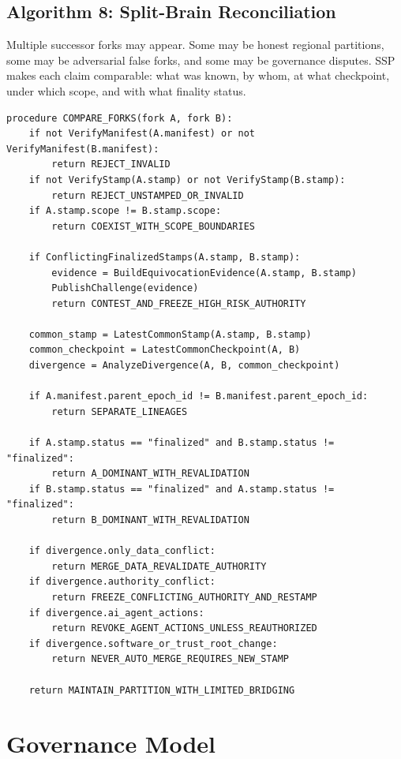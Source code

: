 \documentclass[11pt,letterpaper]{article}
\begin{document}
\subsection{Algorithm 8: Split-Brain Reconciliation}

Multiple successor forks may appear. Some may be honest regional partitions, some may be adversarial false forks, and some may be governance disputes. SSP makes each claim comparable: what was known, by whom, at what checkpoint, under which scope, and with what finality status.

\begin{lstlisting}[caption={Stamped inter-fork reconciliation}]
procedure COMPARE_FORKS(fork A, fork B):
    if not VerifyManifest(A.manifest) or not VerifyManifest(B.manifest):
        return REJECT_INVALID
    if not VerifyStamp(A.stamp) or not VerifyStamp(B.stamp):
        return REJECT_UNSTAMPED_OR_INVALID
    if A.stamp.scope != B.stamp.scope:
        return COEXIST_WITH_SCOPE_BOUNDARIES

    if ConflictingFinalizedStamps(A.stamp, B.stamp):
        evidence = BuildEquivocationEvidence(A.stamp, B.stamp)
        PublishChallenge(evidence)
        return CONTEST_AND_FREEZE_HIGH_RISK_AUTHORITY

    common_stamp = LatestCommonStamp(A.stamp, B.stamp)
    common_checkpoint = LatestCommonCheckpoint(A, B)
    divergence = AnalyzeDivergence(A, B, common_checkpoint)

    if A.manifest.parent_epoch_id != B.manifest.parent_epoch_id:
        return SEPARATE_LINEAGES

    if A.stamp.status == "finalized" and B.stamp.status != "finalized":
        return A_DOMINANT_WITH_REVALIDATION
    if B.stamp.status == "finalized" and A.stamp.status != "finalized":
        return B_DOMINANT_WITH_REVALIDATION

    if divergence.only_data_conflict:
        return MERGE_DATA_REVALIDATE_AUTHORITY
    if divergence.authority_conflict:
        return FREEZE_CONFLICTING_AUTHORITY_AND_RESTAMP
    if divergence.ai_agent_actions:
        return REVOKE_AGENT_ACTIONS_UNLESS_REAUTHORIZED
    if divergence.software_or_trust_root_change:
        return NEVER_AUTO_MERGE_REQUIRES_NEW_STAMP

    return MAINTAIN_PARTITION_WITH_LIMITED_BRIDGING
\end{lstlisting}

\section{Governance Model}
\end{document}
